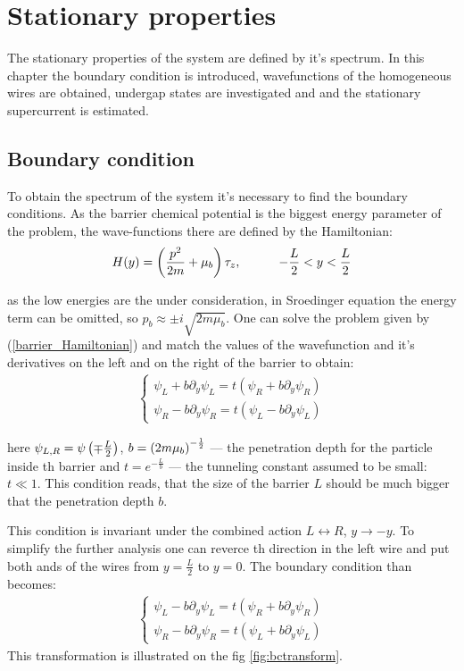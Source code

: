 \chapter{Stationary properties} 
\label{chap:stationary_properties}
The stationary properties of the system are defined by it's spectrum. In this chapter the boundary condition is introduced, wavefunctions of the homogeneous wires are obtained, undergap states are investigated and  and the stationary supercurrent is estimated.

\section{Boundary condition}

To obtain the spectrum of the system it's necessary to find the boundary conditions. As the barrier chemical potential  is the biggest energy parameter of the problem, the wave-functions there are defined by the Hamiltonian:
\begin{gather}
\label{barrier_Hamiltonian}
	H(y)
	=
	\left(
		\frac{p^2}{2m}
		+\mu_b
	\right)\tau_z,  ~~~~~~~~~-\frac{L}{2}<y<\frac{L}{2}
\end{gather} 

as the low energies are the under consideration, in Sroedinger equation the energy term can be omitted, so $ p_b\approx\pm i \sqrt{2m\mu_b} $. One can solve the problem given by (\ref{barrier_Hamiltonian}) and match the values of the wavefunction and it's derivatives on the left and on the right of the barrier to obtain:
\begin{gather}
	\begin{cases}
	\psi_L + b\partial_y\psi_L=t(\psi_R + b\partial_y\psi_R) \\
	\psi_R - b\partial_y\psi_R=t(\psi_L - b\partial_y\psi_L)
	\end{cases}
\end{gather}

here $ \psi_{L,R}=\psi\left(\mp\frac{L}{2}\right) $, $ b=\left({2m\mu_b}\right)^{-\frac{1}{2}} $ --- the penetration depth for the particle inside th barrier and $ t = e^{-\frac{L}{b} }$ --- the tunneling constant assumed to be small: $ t\ll 1 $. This condition reads, that the size of the barrier $ L $ should be  much bigger that the penetration depth $ b $.

This condition is invariant under the combined action $ L\leftrightarrow R $, $ y\to-y $. To simplify the further analysis one can reverce th direction in the left wire and put both ands of the wires from $ y= \frac{L}{2} $ to $ y=0 $. The boundary condition than becomes:
\begin{gather}
\label{bc_transformed}
\begin{cases}
\psi_L - b\partial_y\psi_L=t(\psi_R + b\partial_y\psi_R) \\
\psi_R - b\partial_y\psi_R=t(\psi_L + b\partial_y\psi_L)
\end{cases}
\end{gather}
This transformation is illustrated on the fig \ref{fig:bctransform}.


